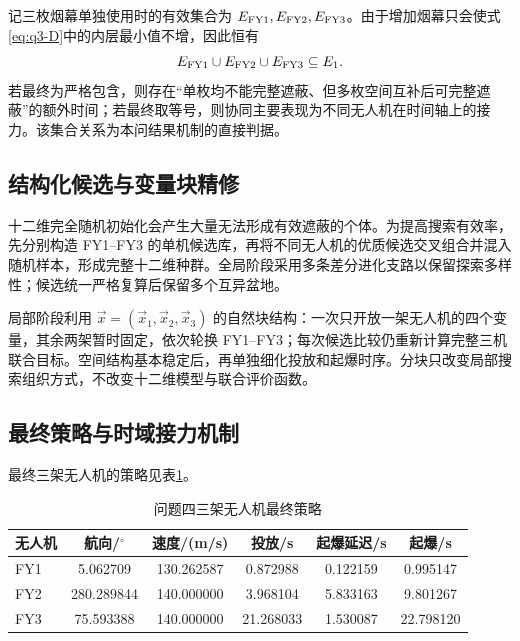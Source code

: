 记三枚烟幕单独使用时的有效集合为 $E_{\rm FY1},E_{\rm FY2},E_{\rm FY3}$。由于增加烟幕只会使式\eqref{eq:q3-D}中的内层最小值不增，因此恒有
\begin{equation}
E_{\rm FY1}\cup E_{\rm FY2}\cup E_{\rm FY3}\subseteq E_1.
\label{eq:q4-union-relation}
\end{equation}
若最终为严格包含，则存在“单枚均不能完整遮蔽、但多枚空间互补后可完整遮蔽”的额外时间；若最终取等号，则协同主要表现为不同无人机在时间轴上的接力。该集合关系为本问结果机制的直接判据。

\subsection{结构化候选与变量块精修}
十二维完全随机初始化会产生大量无法形成有效遮蔽的个体。为提高搜索有效率，先分别构造 FY1--FY3 的单机候选库，再将不同无人机的优质候选交叉组合并混入随机样本，形成完整十二维种群。全局阶段采用多条差分进化支路以保留探索多样性；候选统一严格复算后保留多个互异盆地。

局部阶段利用 $\vec x=(\vec x_1,\vec x_2,\vec x_3)$ 的自然块结构：一次只开放一架无人机的四个变量，其余两架暂时固定，依次轮换 FY1--FY3；每次候选比较仍重新计算完整三机联合目标。空间结构基本稳定后，再单独细化投放和起爆时序。分块只改变局部搜索组织方式，不改变十二维模型与联合评价函数。


\subsection{最终策略与时域接力机制}
最终三架无人机的策略见表\ref{tab:q4}。

\begin{table}[tbp]
\centering
\caption{问题四三架无人机最终策略}
\label{tab:q4}
\small
\begin{tabular}{lccccc}
\toprule
无人机 & 航向/$^\circ$ & 速度/(m/s) & 投放/s & 起爆延迟/s & 起爆/s \\
\midrule
FY1 & 5.062709 & 130.262587 & 0.872988 & 0.122159 & 0.995147 \\
FY2 & 280.289844 & 140.000000 & 3.968104 & 5.833163 & 9.801267 \\
FY3 & 75.593388 & 140.000000 & 21.268033 & 1.530087 & 22.798120 \\
\bottomrule
\end{tabular}
\end{table}

